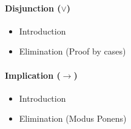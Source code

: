 \paragraph{Disjunction ($\lor$)}
\begin{itemize}
    \item Introduction
          \begin{minipage}[t]{0.5\textwidth}
    \begin{prooftree}
    \end{prooftree}
      \end{minipage}\hfill
      \begin{minipage}[t]{0.5\textwidth}
    \begin{prooftree}
    \end{prooftree}
      \end{minipage}
    \item Elimination (Proof by cases)
    \begin{prooftree}
    \end{prooftree}
\end{itemize}
\paragraph{Implication ($\to$)}
\begin{itemize}
    \item Introduction
    \begin{prooftree}
    \end{prooftree}
    \item Elimination (Modus Ponens)
    \begin{prooftree}
    \end{prooftree}
\end{itemize}

